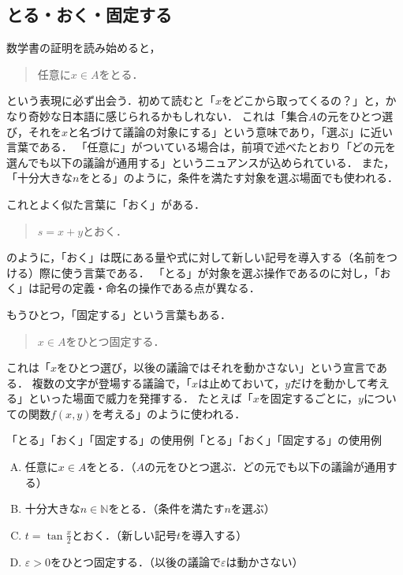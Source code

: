 \subsection{とる・おく・固定する}

数学書の証明を読み始めると，
\begin{quote}
  任意に$x \in A$をとる．
\end{quote}
という表現に必ず出会う．初めて読むと「$x$をどこから取ってくるの？」と，かなり奇妙な日本語に感じられるかもしれない．
これは「集合$A$の元をひとつ選び，それを$x$と名づけて議論の対象にする」という意味であり，「選ぶ」に近い言葉である．
「任意に」がついている場合は，前項で述べたとおり「どの元を選んでも以下の議論が通用する」というニュアンスが込められている．
また，「十分大きな$n$をとる」のように，条件を満たす対象を選ぶ場面でも使われる．

これとよく似た言葉に「おく」がある．
\begin{quote}
  $s=x+y$とおく．
\end{quote}
のように，「おく」は既にある量や式に対して新しい記号を導入する（名前をつける）際に使う言葉である．
「とる」が対象を選ぶ操作であるのに対し，「おく」は記号の定義・命名の操作である点が異なる．

もうひとつ，「固定する」という言葉もある．
\begin{quote}
  $x \in A$をひとつ固定する．
\end{quote}
これは「$x$をひとつ選び，以後の議論ではそれを動かさない」という宣言である．
複数の文字が登場する議論で，「$x$は止めておいて，$y$だけを動かして考える」といった場面で威力を発揮する．
たとえば「$x$を固定するごとに，$y$についての関数$f(x,y)$を考える」のように使われる．

\begin{example}{「とる」「おく」「固定する」の使用例}{「とる」「おく」「固定する」の使用例}
  \begin{enumerate}[(A)]
    \item 任意に$x \in A$をとる．（$A$の元をひとつ選ぶ．どの元でも以下の議論が通用する）
    \item 十分大きな$n \in \mathbb{N}$をとる．（条件を満たす$n$を選ぶ）
    \item $t = \tan \frac{x}{2}$とおく．（新しい記号$t$を導入する）
    \item $\varepsilon > 0$をひとつ固定する．（以後の議論で$\varepsilon$は動かさない）
  \end{enumerate}
\end{example}

